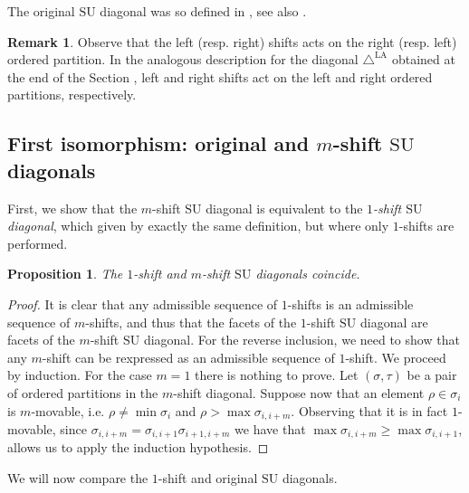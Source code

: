 \documentclass{amsart}
\newcommand{\Guillaume}[1]{\todo[color=magenta!30]{\rm #1 \\ \hfill --- G.}}
\newtheorem{proposition}[theorem]{Proposition}
\theoremstyle{definition}
\newtheorem{remark}[theorem]{Remark}
\newcommand{\SU}{\mathrm{SU}}
\newcommand{\LAD}{\triangle^{\mathrm{LA}}}
\begin{document}
The original $\SU$ diagonal was so defined in \cite{SaneblidzeUmble04}, see also \cite{saneblidzeComparingDiagonalsAssociahedra2022}.

\begin{remark}
    Observe that the left (resp. right) shifts acts on the right (resp. left) ordered partition.
    In the analogous description for the diagonal $\LAD$ obtained at the end of the Section \Guillaume{[REF]}, left and right shifts act on the left and right ordered partitions, respectively. 
\end{remark}


\subsection{First isomorphism: original and $m$-shift $\SU$ diagonals}

First, we show that the $m$-shift $\SU$ diagonal is equivalent to the \emph{$1$-shift $\SU$ diagonal}, which given by exactly the same definition, but where only $1$-shifts are performed. 

\begin{proposition}
    \label{prop:iso-1-to-m-shift}
    The $1$-shift and $m$-shift $\SU$ diagonals coincide.
\end{proposition}

\begin{proof}
    It is clear that any admissible sequence of $1$-shifts is an admissible sequence of $m$-shifts, and thus that the facets of the $1$-shift $\SU$ diagonal are facets of the $m$-shift $\SU$ diagonal. 
    For the reverse inclusion, we need to show that any $m$-shift can be rexpressed as an admissible sequence of $1$-shift. 
    We proceed by induction.
    For the case $m=1$ there is nothing to prove.
    Let $(\sigma,\tau)$ be a pair of ordered partitions in the $m$-shift diagonal. 
    Suppose now that an element $\rho \in \sigma_i$ is $m$-movable, i.e. $\rho \neq \min \sigma_i$ and $\rho > \max \sigma_{i,i+m}$.
    Observing that it is in fact $1$-movable, since $\sigma_{i,i+m}=\sigma_{i,i+1}\sigma_{i+1,i+m}$ we have that $\max \sigma_{i,i+m}\geq \max \sigma_{i,i+1}$, allows us to apply the induction hypothesis.
\end{proof}

We will now compare the $1$-shift and original $\SU$ diagonals. 
\end{document}
